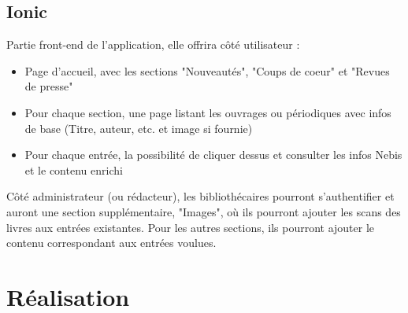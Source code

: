 \documentclass[a4paper, 12pt]{article}
\begin{document}
\subsection{Ionic}
Partie front-end de l'application, elle offrira côté utilisateur :
\begin{itemize}
    \item Page d'accueil, avec les sections "Nouveautés", "Coups de coeur" et "Revues de presse"
    \item Pour chaque section, une page listant les ouvrages ou périodiques avec infos de base
        (Titre, auteur, etc. et image si fournie)
    \item Pour chaque entrée, la possibilité de cliquer dessus et consulter les infos Nebis et le contenu enrichi
\end{itemize}
Côté administrateur (ou rédacteur), les bibliothécaires pourront s'authentifier et auront une section supplémentaire,
"Images", où ils pourront ajouter les scans des livres aux entrées existantes. Pour les autres sections, ils
pourront ajouter le contenu correspondant aux entrées voulues.


\section{Réalisation}
\end{document}

